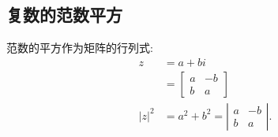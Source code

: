 \subsection{复数的范数平方}
范数的平方作为矩阵的行列式:
$$
  \begin{aligned}
    z       & =a+b i                                                 \\
            & =\left[\begin{array}{cc}
        a & -b \\
        b & a
      \end{array}\right]               \\
    |z|^{2} & =a^{2}+b^{2}=\left|\begin{array}{cc}
      a & -b \\
      b & a
    \end{array}\right| .
  \end{aligned}
$$

